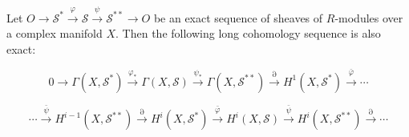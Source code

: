 Let $O \to \mathcal{S}^* \xrightarrow{\varphi} \mathcal{S} \xrightarrow{\psi} \mathcal{S}^{**} \to O$ be an exact sequence of sheaves of $R$-modules over a complex manifold $X$. Then the following long cohomology sequence is also exact:

$$0 \to \Gamma(X, \mathcal{S}^*) \xrightarrow{\varphi_*} \Gamma(X, \mathcal{S}) \xrightarrow{\psi_*} \Gamma(X, \mathcal{S}^{**}) \xrightarrow{\partial} H^1(X, \mathcal{S}^*) \xrightarrow{\bar{\varphi}} \cdots$$

$$\cdots \xrightarrow{\bar{\psi}} H^{i-1}(X, \mathcal{S}^{**}) \xrightarrow{\partial} H^i(X, \mathcal{S}^*) \xrightarrow{\bar{\varphi}} H^i(X, \mathcal{S}) \xrightarrow{\bar{\psi}} H^i(X, \mathcal{S}^{**}) \xrightarrow{\partial} \cdots$$

